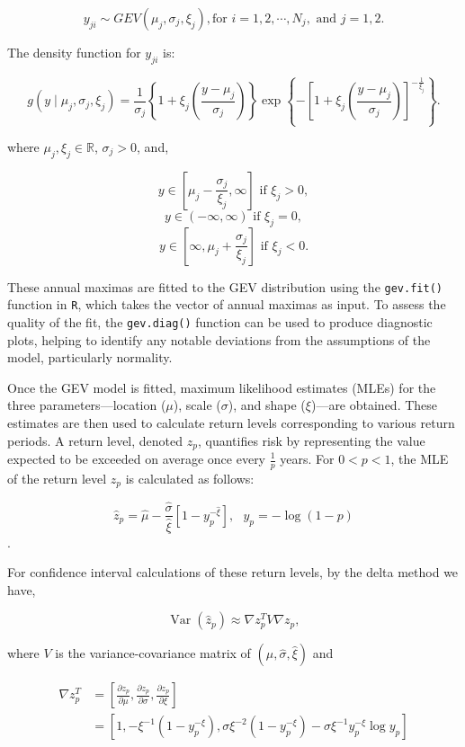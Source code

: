 \documentclass[
  letterpaper,
  DIV=11,
  numbers=noendperiod]{scrartcl}
\begin{document}
\[{y_{ji}} \sim GEV(\mu_j,\sigma_j,\xi_j), \text{for } i =1,2,\cdots, N_j, \mbox{ and } j = 1,2.\]

The density function for \(y_{ji}\) is:

\[g(y\mid \mu_j,\sigma_j,\xi_j) = \frac{1}{\sigma_j} \left\{1 + \xi_j \left(\frac{y - \mu_j}{\sigma_j}\right)\right\}\exp \left\{- \left[1 + \xi_j \left(\frac{y- \mu_j}{\sigma_j}\right)\right]^{-\frac{1}{\xi_j}}\right\}.\]

where \(\mu_j,\xi_j \in \mathbb{R}\), \(\sigma_j >0\), and,

\[y \in \left[ \mu_j - \frac{\sigma_j}{\xi_j}, \infty\right] \text{ if } \xi_j > 0,\]
\[y \in (-\infty,\infty)  \text{ if } \xi_j = 0,\]
\[y \in \left[\infty,  \mu_j + \frac{\sigma_j}{\xi_j}\right] \text{ if } \xi_j < 0.\]

These annual maximas are fitted to the GEV distribution using the
\texttt{gev.fit()} function in \texttt{R}, which takes the vector of
annual maximas as input. To assess the quality of the fit, the
\texttt{gev.diag()} function can be used to produce diagnostic plots,
helping to identify any notable deviations from the assumptions of the
model, particularly normality.

Once the GEV model is fitted, maximum likelihood estimates (MLEs) for
the three parameters---location (\(\mu\)), scale (\(\sigma\)), and shape
(\(\xi\))---are obtained. These estimates are then used to calculate
return levels corresponding to various return periods. A return level,
denoted \(z_p\), quantifies risk by representing the value expected to
be exceeded on average once every \(\frac{1}{p}\) years. For
\(0 < p < 1\), the MLE of the return level \(z_p\) is calculated as
follows:

\[\hat z_p = \hat\mu - \frac{\hat\sigma}{\hat\xi} \left[1-y_p^{-\hat\xi}\right], \text{ } y_p = - \log(1-p)\].

For confidence interval calculations of these return levels, by the
delta method we have,

\[\operatorname{Var}(\hat{z}_{p}) \approx \nabla z_{p}^{T} V \nabla z_{p},\]

where \(V\) is the variance-covariance matrix of
\((\hat{\mu}, \hat{\sigma}, \hat{\xi})\) and

\begin{align*}
\nabla z_{p}^{T} 
&= \left[\frac{\partial z_{p}}{\partial \mu}, \frac{\partial z_{p}}{\partial \sigma}, \frac{\partial z_{p}}{\partial \xi}\right] \\
&= \left[1, -\xi^{-1}(1 - y_{p}^{-\xi}), \sigma \xi^{-2}(1 - y_{p}^{-\xi}) - \sigma \xi^{-1} y_{p}^{-\xi} \log y_{p}\right]
\end{align*}
\end{document}

